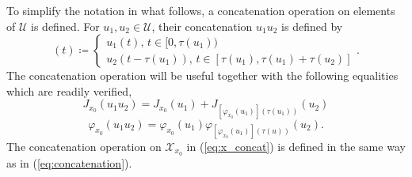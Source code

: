 \documentclass{llncs}
\begin{document}
To simplify the notation in what follows, a concatenation operation on elements of $\mathcal{U}$ is defined.
For $u_{1},u_{2}\in\mathcal{U}$, their concatenation $u_{1}u_{2}$
is defined by 
\begin{equation}
[u_{1}u_{2}](t)\coloneqq\left\{ \begin{array}{c}
u_{1}(t),\, t\in[0,\tau(u_{1}))\\
u_{2}(t-\tau(u_{1})),\, t\in[\tau(u_{1}),\tau(u_{1})+\tau(u_{2})]
\end{array}\right..\label{eq:concatenation}
\end{equation}
%
The concatenation operation will be useful together
with the following equalities which are readily verified, 
\begin{equation}\label{eq:cost_homo}
J_{x_{0}}(u_{1}u_{2})=J_{x_{0}}(u_{1})+J_{[\varphi_{x_0}(u_1)](\tau(u_1))}(u_{2})
\end{equation}
\begin{equation}
\ensuremath{\varphi_{x_{0}}(u_{1}u_{2})=\varphi_{x_{0}}(u_{1})\varphi_{[\varphi_{x_{0}}(u_1)](\tau(u))}(u_{2})}.\label{eq:x_concat}
\end{equation}
The concatenation operation on $\mathcal{X}_{x_{0}}$ in (\ref{eq:x_concat})
is defined in the same way as in (\ref{eq:concatenation}). 
%
\end{document}
